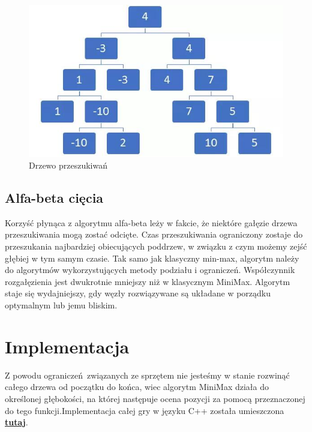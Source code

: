 \documentclass[12pt]{article}
\begin{document}
                \begin{figure}[H]
                    \centering
                    \includegraphics[width = 15cm]{drzewo.jpeg}
                    \caption{Drzewo przeszukiwań}
                    \label{fig: drzewo}
                    
                \end{figure}

            \subsection{Alfa-beta cięcia}
            Korzyść płynąca z algorytmu alfa-beta leży w fakcie, że niektóre gałęzie drzewa przeszukiwania mogą zostać odcięte. Czas przeszukiwania ograniczony zostaje do przeszukania najbardziej obiecujących poddrzew, w związku z czym możemy zejść głębiej w tym samym czasie. Tak samo jak klasyczny min-max, algorytm należy do algorytmów wykorzystujących metody podziału i ograniczeń. Współczynnik rozgałęzienia jest dwukrotnie mniejszy niż w klasycznym  MiniMax. Algorytm staje się wydajniejszy, gdy węzły rozwiązywane są układane w porządku optymalnym lub jemu bliskim.
            
    \section{Implementacja}
        
        Z powodu ograniczeń związanych ze sprzętem nie jesteśmy w stanie rozwinąć całego drzewa od początku do końca, wiec algorytm MiniMax działa do 
        określonej głębokości, na której  następuje ocena pozycji za pomocą przeznaczonej do tego funkcji.Implementacja całej gry w języku C++ została umieszczona \href{https://github.com/PartyKusZ/PAMSI/tree/main/projekt_3-czerwiec}{\textbf{tutaj}}.
\end{document}

